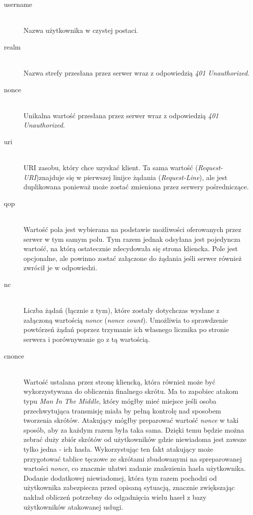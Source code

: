 \documentclass[11pt]{aghdpl}
\begin{document}
\begin{description}
\item[username] \hfill \\
Nazwa użytkownika w czystej postaci.
\item[realm] \hfill \\
Nazwa strefy przesłana przez serwer wraz z odpowiedzią \emph{401 Unauthorized}.
\item[nonce] \hfill \\
Unikalna wartość przesłana przez serwer wraz z odpowiedzią \emph{401 Unauthorized}.
\item[uri] \hfill \\
URI zasobu, który chce uzyskać klient. Ta sama wartość (\emph{Request-URI})znajduje się w pierwszej linijce żądania (\emph{Request-Line}), ale jest duplikowana ponieważ może zostać zmieniona przez serwery pośredniczące.
\item[qop] \hfill \\
Wartość pola jest wybierana na podstawie możliwości oferowanych przez serwer w tym samym polu. Tym razem jednak odsyłana jest pojedyncza wartość, na którą ostatecznie zdecydowała się strona kliencka. Pole jest opcjonalne, ale powinno zostać załączone do żądania jeśli serwer również zwrócił je w odpowiedzi.
\item[nc] \hfill \\
Liczba żądań (łącznie z tym), które zostały dotychczas wysłane z załączoną wartością \emph{nonce} (\emph{nonce count}). Umożliwia to sprawdzenie powtórzeń żądań poprzez trzymanie ich własnego licznika po stronie serwera i porównywanie go z tą wartością.
\item[cnonce] \hfill \\
Wartość ustalana przez stronę kliencką, która również może być wykorzystywana do obliczenia finalnego skrótu. Ma to zapobiec atakom typu \emph{Man In The Middle}, który mógłby mieć miejsce jeśli osoba przechwytująca transmisję miała by pełną kontrolę nad sposobem tworzenia skrótów. Atakujący mógłby preparować wartość \emph{nonce} w taki sposób, aby za każdym razem była taka sama. Dzięki temu będzie można zebrać duży zbiór skrótów od użytkowników gdzie niewiadoma jest zawsze tylko jedna - ich hasła. Wykorzystując ten fakt atakujący może przygotować tablice tęczowe ze skrótami zbudowanymi na spreparowanej wartości \emph{nonce}, co znacznie ułatwi zadanie znalezienia hasła użytkownika. Dodanie dodatkowej niewiadomej, która tym razem pochodzi od użytkownika zabezpiecza przed opisaną sytuacją, znacznie zwiększając nakład obliczeń potrzebny do odgadnięcia wielu haseł z bazy użytkowników atakowanej usługi.

\end{description}
\end{document}
